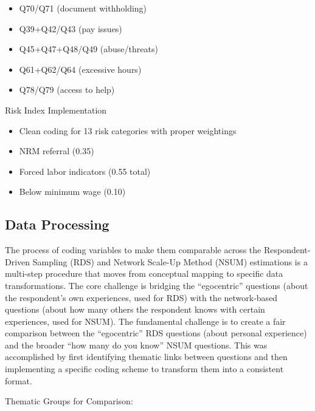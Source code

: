 \documentclass[
  12pt,
  letterpaper,
  DIV=11,
  numbers=noendperiod]{scrartcl}
\providecommand{\tightlist}{%
  \setlength{\itemsep}{0pt}\setlength{\parskip}{0pt}}
\theoremstyle{plain}
\theoremstyle{definition}
\begin{document}
\begin{itemize}
\tightlist
\item
  Q70/Q71 (document withholding)
\item
  Q39+Q42/Q43 (pay issues)
\item
  Q45+Q47+Q48/Q49 (abuse/threats)
\item
  Q61+Q62/Q64 (excessive hours)
\item
  Q78/Q79 (access to help)
\end{itemize}

Risk Index Implementation

\begin{itemize}
\tightlist
\item
  Clean coding for 13 risk categories with proper weightings
\item
  NRM referral (0.35)
\item
  Forced labor indicators (0.55 total)
\item
  Below minimum wage (0.10)
\end{itemize}

\subsection{Data Processing}\label{app-dataprep}

The process of coding variables to make them comparable across the
Respondent-Driven Sampling (RDS) and Network Scale-Up Method (NSUM)
estimations is a multi-step procedure that moves from conceptual mapping
to specific data transformations. The core challenge is bridging the
``egocentric'' questions (about the respondent's own experiences, used
for RDS) with the network-based questions (about how many others the
respondent knows with certain experiences, used for NSUM). The
fundamental challenge is to create a fair comparison between the
``egocentric'' RDS questions (about personal experience) and the broader
``how many do you know'' NSUM questions. This was accomplished by first
identifying thematic links between questions and then implementing a
specific coding scheme to transform them into a consistent format.

Thematic Groups for Comparison:
\end{document}

